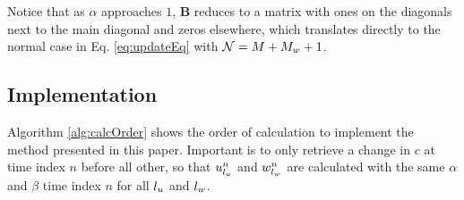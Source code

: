 %
Notice that as $\alpha$ approaches $1$, $\mathbf{B}$ reduces to a matrix with ones on the diagonals next to the main diagonal and zeros elsewhere, which translates directly to the normal case in Eq. \eqref{eq:updateEq} with $\mathcal{N} = M + M_w + 1$. 

\subsection{Implementation}
Algorithm \ref{alg:calcOrder} shows the order of calculation to implement the method presented in this paper. Important is to only retrieve a change in $c$ at time index $n$ before all other, so that $u_{l_u}^n$ and $w_{l_w}^n$ are calculated with the same $\alpha$ and $\beta$ time index $n$ for all ${l_u}$ and ${l_w}$.
